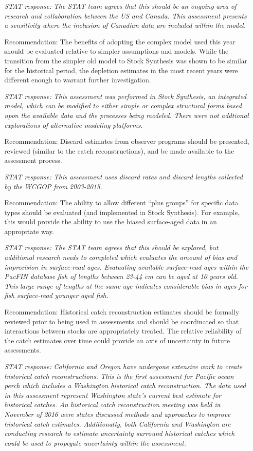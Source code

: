 \documentclass[12pt,]{article}
\begin{document}
\emph{STAT response: The STAT team agrees that this should be an ongoing
area of research and collaboration between the US and Canada. This
assessment presents a sensitivity where the inclusion of Canadian data
are included within the model.}

Recommendation: The benefits of adopting the complex model used this
year should be evaluated relative to simpler assumptions and models.
While the transition from the simpler old model to Stock Synthesis was
shown to be similar for the historical period, the depletion estimates
in the most recent years were different enough to warrant further
investigation.

\emph{STAT response: This assessment was performed in Stock Synthesis,
an integrated model, which can be modified to either simple or complex
structural forms based upon the available data and the processes being
modeled. There were not addtional explorations of alternative modeling
platforms.}

Recommendation: Discard estimates from observer programs should be
presented, reviewed (similar to the catch reconstructions), and be made
available to the assessment process.

\emph{STAT response: This assessment uses discard rates and discard
lengths collected by the WCGOP from 2003-2015.}

Recommendation: The ability to allow different ``plus groups'' for
specific data types should be evaluated (and implemented in Stock
Synthesis). For example, this would provide the ability to use the
biased surface-aged data in an appropriate way.

\emph{STAT response: The STAT team agrees that this should be explored,
but additional research needs to completed which evaluates the amount of
bias and imprecision in surface-read ages. Evaluating available
surface-read ages within the PacFIN database fish of lengths between
23-44 cm can be aged at 10 years old. This large range of lengths at the
same age indicates considerable bias in ages for fish surface-read
younger aged fish.}

Recommendation: Historical catch reconstruction estimates should be
formally reviewed prior to being used in assessments and should be
coordinated so that interactions between stocks are appropriately
treated. The relative reliability of the catch estimates over time could
provide an axis of uncertainty in future assessments.

\emph{STAT response: California and Oregon have undergone extensive work
to create historical catch reconstructions. This is the first assessment
for Pacific ocean perch which includes a Washington historical catch
reconstruction. The data used in this assessment represent Washington
state's current best estimate for historical catches. An historical
catch reconstruction meeting was held in November of 2016 were states
discussed methods and approaches to improve historical catch estimates.
Additionally, both California and Washington are conducting research to
estimate uncertainty surround historical catches which could be used to
propegate uncertainty within the assessment.}
\end{document}
